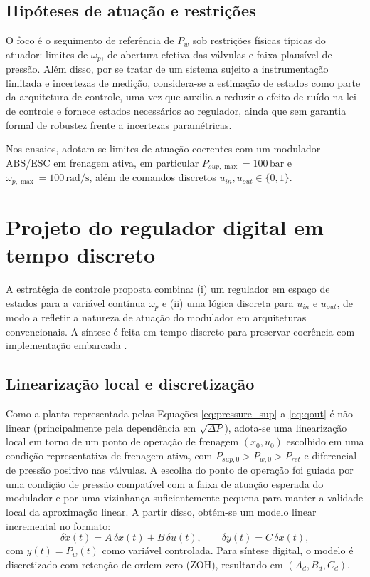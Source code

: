 \documentclass[a4paper]{ifacconf}
\begin{document}
\subsection{Hipóteses de atuação e restrições}
O foco é o seguimento de referência de $P_w$ sob restrições físicas típicas do atuador: limites de $\omega_p$, de abertura efetiva das válvulas e faixa plausível de pressão. Além disso, por se tratar de um sistema sujeito a instrumentação limitada e incertezas de medição, considera-se a estimação de estados como parte da arquitetura de controle, uma vez que auxilia a reduzir o efeito de ruído na lei de controle e fornece estados necessários ao regulador, ainda que sem garantia formal de robustez frente a incertezas paramétricas.

Nos ensaios, adotam-se limites de atuação coerentes com um modulador ABS/ESC em frenagem ativa, em particular $P_{sup,\max}=100\,\mathrm{bar}$ e $\omega_{p,\max}=100\,\mathrm{rad/s}$, além de comandos discretos $u_{in},u_{out}\in\{0,1\}$.

\section{Projeto do regulador digital em tempo discreto}
\label{sec:controle}
A estratégia de controle proposta combina: (i) um regulador em espaço de estados para a variável contínua $\omega_p$ e (ii) uma lógica discreta para $u_{in}$ e $u_{out}$, de modo a refletir a natureza de atuação do modulador em arquiteturas convencionais. A síntese é feita em tempo discreto para preservar coerência com implementação embarcada \cite{FranklinPowellWorkman1998,Ogata1997}.

\subsection{Linearização local e discretização}
Como a planta representada pelas Equações \eqref{eq:pressure_sup} a \eqref{eq:qout} é não linear (principalmente pela dependência em $\sqrt{\Delta P}$), adota-se uma linearização local em torno de um ponto de operação de frenagem $(x_0,u_0)$ escolhido em uma condição representativa de frenagem ativa, com $P_{sup,0}>P_{w,0}>P_{ret}$ e diferencial de pressão positivo nas válvulas. A escolha do ponto de operação foi guiada por uma condição de pressão compatível com a faixa de atuação esperada do modulador e por uma vizinhança suficientemente pequena para manter a validade local da aproximação linear. A partir disso, obtém-se um modelo linear incremental no formato:
\begin{equation}
   \delta \dot{x}(t)=A\,\delta x(t)+B\,\delta u(t),
   \qquad
   \delta y(t)=C\,\delta x(t),
   \label{eq:lin_ss}
\end{equation}
com $y(t)=P_w(t)$ como variável controlada. Para síntese digital, o modelo é discretizado com retenção de ordem zero (ZOH), resultando em $(A_d,B_d,C_d)$.
\end{document}
